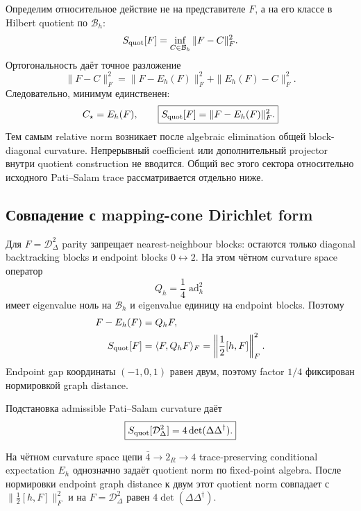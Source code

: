 Определим относительное действие не на представителе \(F\), а на его классе
в Hilbert quotient по \(\mathcal B_h\):
\begin{equation}
 S_{\rm quot}[F]
 =\inf_{C\in\mathcal B_h}\|F-C\|_F^2.
 \label{eq:ps-relative-quotient-action}
\end{equation}
Ортогональность даёт точное разложение
\begin{equation}
 \|F-C\|_F^2
 =\|F-E_h(F)\|_F^2+\|E_h(F)-C\|_F^2.
 \label{eq:ps-relative-pythagoras}
\end{equation}
Следовательно, минимум единственен:
\begin{equation}
 C_\star=E_h(F),
 \qquad
 \boxed{S_{\rm quot}[F]=\|F-E_h(F)\|_F^2.}
 \label{eq:ps-relative-auxiliary-elimination}
\end{equation}
Тем самым relative norm возникает после algebraic elimination общей
block-diagonal curvature. Непрерывный coefficient или дополнительный
projector внутри quotient construction не вводится. Общий вес этого сектора
относительно исходного Pati--Salam trace рассматривается отдельно ниже.

\subsection{Совпадение с mapping-cone Dirichlet form}

Для \(F=\mathcal D_\Delta^2\) parity запрещает nearest-neighbour blocks:
остаются только diagonal backtracking blocks и endpoint blocks
\(0\leftrightarrow2\). На этом чётном curvature space оператор
\begin{equation}
 Q_h=\frac14\operatorname{ad}_h^2
\end{equation}
имеет eigenvalue ноль на \(\mathcal B_h\) и eigenvalue единицу на endpoint
blocks. Поэтому
\begin{align}
 F-E_h(F)&=Q_hF,\\
 S_{\rm quot}[F]
 &=\langle F,Q_hF\rangle_F
 =\left\|\frac12[h,F]\right\|_F^2.
 \label{eq:ps-relative-quotient-dirichlet}
\end{align}
Endpoint gap координаты \((-1,0,1)\) равен двум, поэтому factor \(1/4\)
фиксирован нормировкой graph distance.

Подстановка admissible Pati--Salam curvature даёт
\begin{equation}
 \boxed{
 S_{\rm quot}[\mathcal D_\Delta^2]
 =4\det(\Delta\Delta^\dagger).}
 \label{eq:ps-relative-quotient-selector}
\end{equation}

\begin{theorem}
На чётном curvature space цепи \(\bar4\to2_R\to4\) trace-preserving
conditional expectation \(E_h\) однозначно задаёт quotient norm по
fixed-point algebra. После нормировки endpoint graph distance к двум этот
quotient norm совпадает с \(\|\frac12[h,F]\|_F^2\) и на
\(F=\mathcal D_\Delta^2\) равен
\(4\det(\Delta\Delta^\dagger)\).
\end{theorem}

